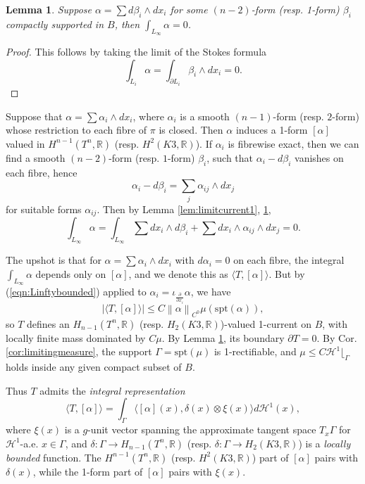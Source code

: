 \documentclass{article}
\newtheorem{lem}[thm]{Lemma}
\theoremstyle{definition}
\newcommand{\R}{\mathbb{R}}
\newcommand{\norm}[1]{\left\lVert#1\right\rVert}
\begin{document}
				
		\begin{lem}\label{lem:limitcurrent2}
			Suppose $\alpha= \sum d\beta_i\wedge dx_i$ for some $(n-2)$-form (resp. 1-form) $\beta_i$ compactly supported in $B$, then $\int_{L_\infty} \alpha=0$.
		\end{lem}
		
		\begin{proof}
		This follows by taking the limit of the Stokes formula
		\[
		\int_{L_i} \alpha= \int_{\partial L_i}  \beta_i\wedge dx_i=0.
		\]
		\end{proof}
		
		
		
		
		Suppose that $\alpha= \sum \alpha_i \wedge dx_i$, where $\alpha_i$ is a smooth $(n-1)$-form (resp. $2$-form) whose restriction to each fibre of $\pi$ is closed. Then $\alpha$ induces a 1-form $[\alpha]$ valued in $H^{n-1}(T^n,\R)$ (resp. $H^2(K3, \R)$). If $\alpha_i$ is fibrewise exact, then we can find a smooth $(n-2)$-form (resp. $1$-form) $\beta_i$, such that $\alpha_i- d\beta_i$ vanishes on each fibre, hence 
		\[
		\alpha_i- d\beta_i= \sum_j \alpha_{ij} \wedge dx_j
		\]
		for suitable forms $\alpha_{ij}$. Then by Lemma \ref{lem:limitcurrent1}, \ref{lem:limitcurrent2},
		\[
		\int_{L_\infty} \alpha= \int_{L_\infty}  \sum dx_i\wedge d\beta_i + \sum dx_i\wedge \alpha_{ij} \wedge dx_j=0.
		\]
	
	
	The upshot is that for $\alpha= \sum \alpha_i \wedge dx_i$ with $d\alpha_i=0$ on each fibre, the integral $\int_{L_\infty} \alpha$ depends only on $[\alpha]$, and we denote this as $\langle T, [\alpha]\rangle$. But by (\ref{eqn:Linftybounded}) applied to $\alpha_i= \iota_{\frac{\partial}{\partial x_i}  }\alpha$, we have
	\[
	| \langle T, [\alpha]\rangle   |\leq   C \norm{ \alpha }_{C^0}  \mu(\text{spt}(\alpha)   ),
	\] 
	so $T$ defines an $H_{n-1}(T^n, \R)$ (resp. $H_2(K3,\R)$)-valued 1-current on $B$, with locally finite mass dominated by $C\mu$. By Lemma \ref{lem:limitcurrent2}, its boundary $\partial T=0$. By Cor. \ref{cor:limitingmeasure}, the support $\Gamma= \text{spt}(\mu)$ is 1-rectifiable, and $\mu\leq C \mathcal{H}^1\lfloor_\Gamma$ holds inside any given compact subset of $B$. 
	
	
	
	
	Thus $T$ admits the \emph{integral representation}
			\begin{equation}\label{eqn:integralrepresentationT}
			\langle T, [\alpha]\rangle = \int_\Gamma  \langle [\alpha](x), \delta(x)\otimes  \xi(x)\rangle  d\mathcal{H}^1(x),
		\end{equation}
		where 
		$\xi(x)$ is a $g$-unit vector spanning the approximate tangent space $T_x \Gamma$ 
		for $\mathcal{H}^1$-a.e. $x\in \Gamma$,  and $\delta: \Gamma\to H_{n-1}(T^n,\R)$ (resp. $   \delta: \Gamma\to H_2(K3,\R)    $) is a \emph{locally bounded} function. The $H^{n-1}(T^n,\R)$ (resp. $H^2(K3, \R)$) part of $[\alpha]$ pairs with $\delta(x)$, while the 1-form part of $[\alpha]$ pairs with $\xi(x)$. 
		
\end{document}
